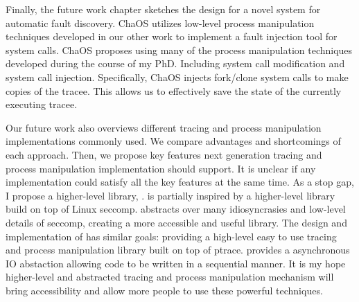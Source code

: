 Finally, the future work chapter sketches the design for a novel system for automatic fault discovery. ChaOS utilizes low-level process manipulation techniques developed in our other work to implement a fault injection tool for system calls. ChaOS proposes using many of the process manipulation techniques developed during the course of my PhD. Including system call modification and system call injection. Specifically, ChaOS injects fork/clone system calls to make copies of the tracee. This allows us to effectively save the state of the currently executing tracee.

Our future work also overviews different tracing and process manipulation implementations commonly used. We compare advantages and shortcomings of each approach. Then, we propose key features next generation tracing and process manipulation implementation should support. It is unclear if any implementation could satisfy all the key features at the same time. As a stop gap, I propose a higher-level library, .  is partially inspired by  a higher-level library build on top of Linux seccomp.  abstracts over many idiosyncrasies and low-level details of seccomp, creating a more accessible and useful library. The design and implementation of  has similar goals: providing a high-level easy to use tracing and process manipulation library built on top of ptrace.  provides a asynchronous IO abstaction allowing code to be written in a sequential manner. It is my hope higher-level and abstracted tracing and process manipulation mechanism will bring accessibility and allow more people to use these powerful techniques.